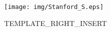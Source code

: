 \documentclass[fleqn]{betterposter}
\begin{document}
{%
\vfill

\texttt{[image: img/Stanford\_S.eps]}\\

}{

TEMPLATE_RIGHT_INSERT

%
}
\end{document}
